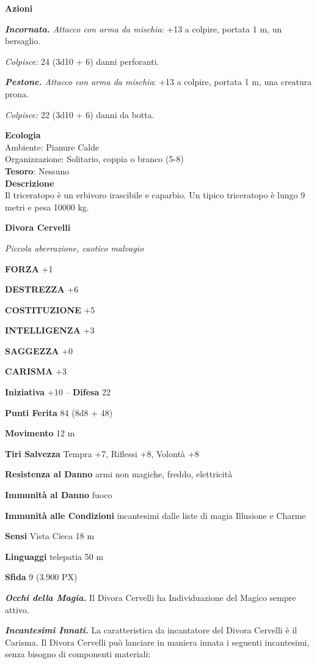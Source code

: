 \begin{multicols}{2}
\textbf{Azioni}

\textit{\textbf{Incornata.} Attacco con arma da mischia}: +13 a colpire, portata 1 m, un bersaglio.

\textit{Colpisce:} 24 (3d10 + 6) danni perforanti.

\textit{\textbf{Pestone.} Attacco con arma da mischia}: +13 a colpire, portata 1 m, una creatura prona.

\textit{Colpisce:} 22 (3d10 + 6) danni da botta.

\textbf{Ecologia}\\
Ambiente: Pianure Calde\\
Organizzazione: Solitario, coppia o branco (5-8)\\
\textbf{Tesoro}: Nessuno\\
\textbf{Descrizione}\\
Il triceratopo è un erbivoro irascibile e caparbio. Un tipico triceratopo è lungo 9 metri e pesa 10000 kg.

\medskip{}\textbf{Divora Cervelli}

\textit{Piccola aberrazione, caotico malvagio}

\textbf{FORZA} +1

\textbf{DESTREZZA} +6

\textbf{COSTITUZIONE} +5

\textbf{INTELLIGENZA} +3

\textbf{SAGGEZZA} +0

\textbf{CARISMA} +3

\textbf{Iniziativa} +10 -- \textbf{Difesa} 22

\textbf{Punti Ferita} 84 (8d8 + 48)

\textbf{Movimento} 12 m

\textbf{Tiri Salvezza} Tempra +7, Riflessi +8, Volontà +8

\textbf{Resistenza al Danno} armi non magiche, freddo, elettricità

\textbf{Immunità al Danno} fuoco

\textbf{Immunità alle Condizioni} incantesimi dalle liste di magia Illusione e Charme

\textbf{Sensi} Vista Cieca 18 m

\textbf{Linguaggi} telepatia 50 m

\textbf{Sfida} 9 (3.900 PX)

\textit{\textbf{Occhi della Magia.}} Il Divora Cervelli ha Individuazione del Magico sempre attivo.

\textit{\textbf{Incantesimi Innati.}} La caratteristica da incantatore del Divora Cervelli è il Carisma. Il Divora Cervelli può lanciare in maniera innata i seguenti incantesimi, senza bisogno di componenti materiali:


\end{multicols}
